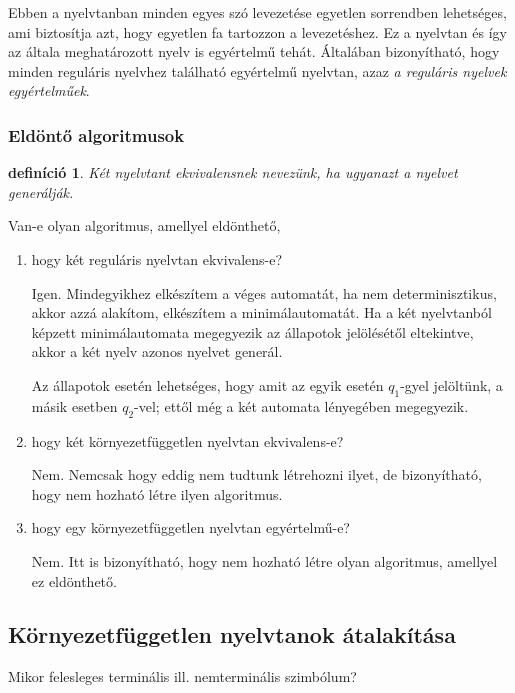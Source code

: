 \documentclass[a4paper]{article}
\newtheorem{definicio}{definíció}[section]
\begin{document}
Ebben a nyelvtanban minden egyes szó levezetése egyetlen sorrendben
lehetséges, ami biztosítja azt, hogy egyetlen fa tartozzon a
levezetéshez. Ez a nyelvtan és így az általa meghatározott nyelv is
egyértelmű tehát. Általában bizonyítható, hogy minden reguláris nyelvhez
található egyértelmű nyelvtan, azaz \emph{a reguláris nyelvek
egyértelműek}.

\subsubsection{Eldöntő algoritmusok}

\begin{definicio}
    \emph{Két nyelvtant ekvivalensnek} nevezünk, ha ugyanazt a nyelvet
    generálják. 
\end{definicio}

Van-e olyan algoritmus, amellyel eldönthető,
\begin{enumerate}
    \item hogy két reguláris nyelvtan ekvivalens-e?

        Igen. Mindegyikhez elkészítem a véges automatát, ha nem
        determinisztikus, akkor azzá alakítom, elkészítem a
        minimálautomatát. Ha a két nyelvtanból képzett minimálautomata
        megegyezik az állapotok jelölésétől eltekintve, akkor a két
        nyelv azonos nyelvet generál.

        Az állapotok esetén lehetséges, hogy amit az egyik esetén
        $q_1$-gyel jelöltünk, a másik esetben $q_2$-vel; ettől még a két
        automata lényegében megegyezik.

    \item  hogy két környezetfüggetlen nyelvtan ekvivalens-e?

        Nem. Nemcsak hogy eddig nem tudtunk létrehozni ilyet, de
        bizonyítható, hogy nem hozható létre ilyen algoritmus.

    \item hogy egy környezetfüggetlen nyelvtan egyértelmű-e?

        Nem. Itt is bizonyítható, hogy nem hozható létre olyan
        algoritmus, amellyel ez eldönthető.
\end{enumerate}


\subsection{Környezetfüggetlen nyelvtanok átalakítása}

Mikor felesleges terminális ill. nemterminális szimbólum?
\end{document}
